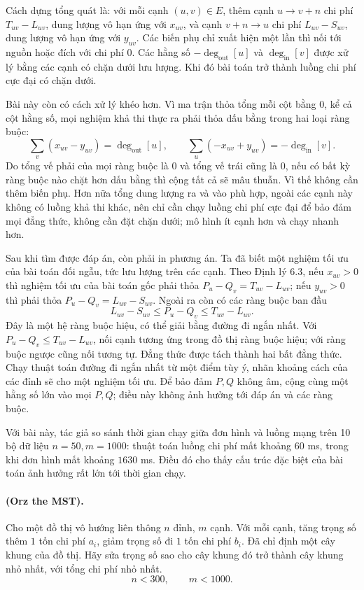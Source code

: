 \documentclass[11pt]{article}
\begin{document}
Cách dựng tổng quát là: với mỗi cạnh \((u,v)\in E\), thêm cạnh
\(u\to v+n\) chi phí \(T_{uv}-L_{uv}\), dung lượng vô hạn ứng với
\(x_{uv}\), và cạnh \(v+n\to u\) chi phí \(L_{uv}-S_{uv}\), dung lượng vô hạn
ứng với \(y_{uv}\). Các biến phụ chỉ xuất hiện một lần thì nối tới nguồn hoặc
đích với chi phí \(0\). Các hằng số \(-\deg_{\mathrm{out}}[u]\) và
\(\deg_{\mathrm{in}}[v]\) được xử lý bằng các cạnh có chặn dưới lưu lượng. Khi
đó bài toán trở thành luồng chi phí cực đại có chặn dưới.

Bài này còn có cách xử lý khéo hơn. Vì ma trận thỏa tổng mỗi cột bằng \(0\),
kể cả cột hằng số, mọi nghiệm khả thi thực ra phải thỏa dấu bằng trong hai
loại ràng buộc:
\[
  \sum_v(x_{uv}-y_{uv})=\deg_{\mathrm{out}}[u],\qquad
  \sum_u(-x_{uv}+y_{uv})=-\deg_{\mathrm{in}}[v].
\]
Do tổng vế phải của mọi ràng buộc là \(0\) và tổng vế trái cũng là \(0\), nếu
có bất kỳ ràng buộc nào chặt hơn dấu bằng thì cộng tất cả sẽ mâu thuẫn. Vì
thế không cần thêm biến phụ. Hơn nữa tổng dung lượng ra và vào phù hợp, ngoài
các cạnh này không có luồng khả thi khác, nên chỉ cần chạy luồng chi phí cực
đại để bảo đảm mọi đẳng thức, không cần đặt chặn dưới; mô hình ít cạnh hơn và
chạy nhanh hơn.

Sau khi tìm được đáp án, còn phải in phương án. Ta đã biết một nghiệm tối ưu
của bài toán đối ngẫu, tức lưu lượng trên các cạnh. Theo Định lý 6.3, nếu
\(x_{uv}>0\) thì nghiệm tối ưu của bài toán gốc phải thỏa
\(P_u-Q_v=T_{uv}-L_{uv}\); nếu \(y_{uv}>0\) thì phải thỏa
\(P_u-Q_v=L_{uv}-S_{uv}\). Ngoài ra còn có các ràng buộc ban đầu
\[
  L_{uv}-S_{uv}\le P_u-Q_v\le T_{uv}-L_{uv}.
\]
Đây là một hệ ràng buộc hiệu, có thể giải bằng đường đi ngắn nhất. Với
\(P_u-Q_v\le T_{uv}-L_{uv}\), nối cạnh tương ứng trong đồ thị ràng buộc hiệu;
với ràng buộc ngược cũng nối tương tự. Đẳng thức được tách thành hai bất đẳng
thức. Chạy thuật toán đường đi ngắn nhất từ một điểm tùy ý, nhãn khoảng cách
của các đỉnh sẽ cho một nghiệm tối ưu. Để bảo đảm \(P,Q\) không âm, cộng cùng
một hằng số lớn vào mọi \(P,Q\); điều này không ảnh hưởng tới đáp án và các
ràng buộc.

Với bài này, tác giả so sánh thời gian chạy giữa đơn hình và luồng mạng trên
10 bộ dữ liệu \(n=50,m=1000\): thuật toán luồng chi phí mất khoảng \(60\) ms,
trong khi đơn hình mất khoảng \(1630\) ms. Điều đó cho thấy cấu trúc đặc biệt
của bài toán ảnh hưởng rất lớn tới thời gian chạy.

\paragraph{ (Orz the MST).}
Cho một đồ thị vô hướng liên thông \(n\) đỉnh, \(m\) cạnh. Với mỗi cạnh, tăng
trọng số thêm \(1\) tốn chi phí \(a_i\), giảm trọng số đi \(1\) tốn chi phí
\(b_i\). Đã chỉ định một cây khung của đồ thị. Hãy sửa trọng số sao cho cây
khung đó trở thành cây khung nhỏ nhất, với tổng chi phí nhỏ nhất.
\[
  n<300,\qquad m<1000.
\]
\end{document}
